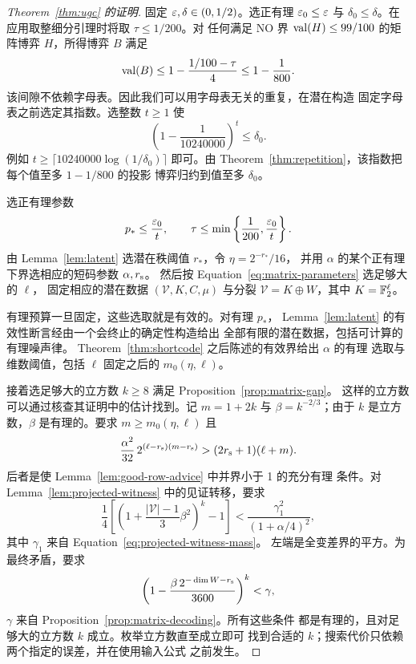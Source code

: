 \begin{proof}[Theorem~\ref{thm:ugc} 的证明]
固定 $\varepsilon,\delta\in(0,1/2)$。选正有理 $\varepsilon_0\le\varepsilon$ 与
$\delta_0\le\delta$。在应用取整细分引理时将取 $\tau\le1/200$。对
任何满足 NO 界 $\operatorname{val}(H)\le99/100$ 的矩阵博弈 $H$，所得博弈 $B$
满足
\begin{equation}
 \operatorname{val}(B)\le1-\frac{1/100-\tau}{4}\le1-\frac1{800}.
 \label{eq:post-subdivision-gap}
\end{equation}
该间隙不依赖字母表。因此我们可以用字母表无关的重复，在潜在构造
固定字母表之前选定其指数。选整数 $t\ge1$ 使
\begin{equation}
 \left(1-\frac1{10240000}\right)^t\le\delta_0.
 \label{eq:final-repetition-gap}
\end{equation}
例如 $t\ge\lceil10240000\log(1/\delta_0)\rceil$ 即可。由
Theorem~\ref{thm:repetition}，该指数把每个值至多 $1-1/800$ 的投影
博弈归约到值至多 $\delta_0$。

选正有理参数
\begin{equation}
 p_*\le\frac{\varepsilon_0}{t},\qquad
 \tau\le\min\left\{\frac1{200},\frac{\varepsilon_0}{t}\right\}.
 \label{eq:final-errors}
\end{equation}
由 Lemma~\ref{lem:latent} 选潜在秩阈值 $r_*$，令 $\eta=2^{-r_*}/16$，
并用 $\alpha$ 的某个正有理下界选相应的短码参数 $\alpha,r_{\rm s}$。
然后按 Equation~\eqref{eq:matrix-parameters} 选足够大的 $\ell$，
固定相应的潜在数据 $(\mathcal V,K,C,\mu)$ 与分裂
$\mathcal V=K\oplus W$，其中 $K=\mathbb F_2^\ell$。

有理预算一旦固定，这些选取就是有效的。对有理 $p_*$，
Lemma~\ref{lem:latent} 的有效性断言经由一个会终止的确定性构造给出
全部有限的潜在数据，包括可计算的有理噪声律。
Theorem~\ref{thm:shortcode} 之后陈述的有效界给出 $\alpha$ 的有理
选取与维数阈值，包括 $\ell$ 固定之后的 $m_0(\eta,\ell)$。

接着选足够大的立方数 $k\ge8$ 满足 Proposition~\ref{prop:matrix-gap}。
这样的立方数可以通过核查其证明中的估计找到。记 $m=1+2k$ 与
$\beta=k^{-2/3}$；由于 $k$ 是立方数，$\beta$ 是有理的。要求
$m\ge m_0(\eta,\ell)$ 且
\[
 \frac{\alpha^2}{32}\,2^{(\ell-r_{\rm s})(m-r_{\rm s})}
 >(2r_{\rm s}+1)(\ell+m).
\]
后者是使 Lemma~\ref{lem:good-row-advice} 中并界小于 1 的充分有理
条件。对 Lemma~\ref{lem:projected-witness} 中的见证转移，要求
\[
 \frac14\left[
 \left(1+\frac{|\mathcal V|-1}{3}\beta^2\right)^k-1\right]
 <\frac{\gamma_1^2}{(1+\alpha/4)^2},
\]
其中 $\gamma_1$ 来自 Equation~\eqref{eq:projected-witness-mass}。
左端是全变差界的平方。为最终矛盾，要求
\[
 \left(1-\frac{\beta\,2^{-\dim W-r_{\rm s}}}{3600}\right)^k
 <\gamma,
\]
$\gamma$ 来自 Proposition~\ref{prop:matrix-decoding}。所有这些条件
都是有理的，且对足够大的立方数 $k$ 成立。枚举立方数直至成立即可
找到合适的 $k$；搜索代价只依赖两个指定的误差，并在使用输入公式
之前发生。


\end{proof}
